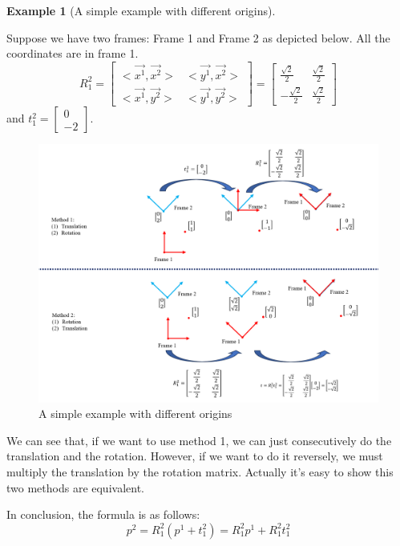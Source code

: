 \documentclass[
]{book}
\theoremstyle{definition}
\theoremstyle{definition}
\newtheorem{example}{Example}[chapter]
\theoremstyle{definition}
\theoremstyle{definition}
\theoremstyle{remark}
\begin{document}
\begin{example}[A simple example with different origins]
\protect\hypertarget{exm:translationex}{}\label{exm:translationex}\leavevmode

Suppose we have two frames: Frame 1 and Frame 2 as depicted below. All the coordinates are in frame 1. \[
    R_1^2 = \begin{bmatrix}<\vec{x^1},\vec{x^2}> &<\vec{y^1},\vec{x^2}> \\
    <\vec{x^1},\vec{y^2}> &<\vec{y^1},\vec{y^2}> \end{bmatrix} = \begin{bmatrix} \frac{\sqrt{2}}{2} &\frac{\sqrt{2}}{2} \\ -\frac{\sqrt{2}}{2} &\frac{\sqrt{2}}{2}\end{bmatrix}\] and \(t_1^2 = \begin{bmatrix} 0\\-2\end{bmatrix}\).

\begin{figure}

{\centering \includegraphics[width=1\linewidth]{images/translation_example} 

}

\caption{A simple example with different origins}\label{fig:translation-example}
\end{figure}

We can see that, if we want to use method 1, we can just consecutively do the translation and the rotation. However, if we want to do it reversely, we must multiply the translation by the rotation matrix. Actually it's easy to show this two methods are equivalent.

In conclusion, the formula is as follows:
\[p^2 = R^2_1(p^1+t_1^2) = R^2_1p^1+R^2_1t_1^2\]

\end{example}
\end{document}
